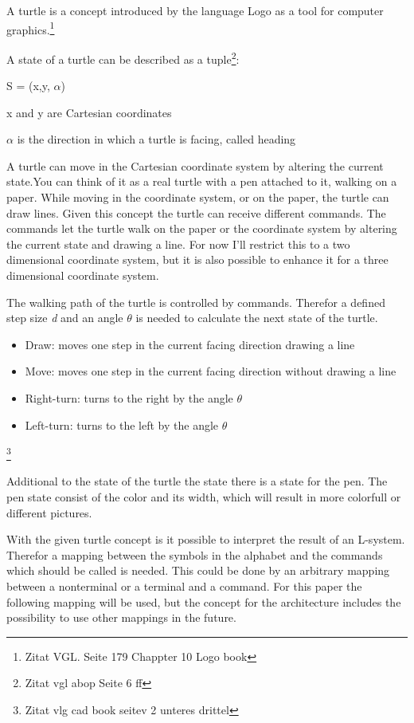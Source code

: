\documentclass[english]{cpp-hmwk}
\begin{document}
\noindent A turtle is a concept introduced by the language Logo as a tool for computer graphics.\footnote{Zitat VGL. Seite 179 Chappter 10 Logo book}

\noindent A state of a turtle can be described as a tuple\footnote{Zitat vgl abop Seite 6 ff}:

\begin{center}
S = (x,y, $\alpha$)
\end{center}

x and y are Cartesian coordinates

$\alpha$ is the direction in which a turtle is facing, called heading

\medskip

\noindent A turtle can move in the Cartesian coordinate system by altering the current state.You can think of it as a real turtle with a pen attached to it, walking on a paper. While moving in the coordinate system, or on the paper, the turtle can draw lines. Given this concept the turtle can receive different commands. The commands let the turtle walk on the paper or the coordinate system by altering the current state and drawing a line. For now I'll restrict this to a two dimensional coordinate system, but it is also possible to enhance it for a three dimensional coordinate system.

\medskip

\noindent The walking path of the turtle is controlled by commands. Therefor a defined step size \textit{d} and an angle \textit{$\theta$ } is needed to calculate the next state of the turtle.

\begin{itemize}
\item Draw: moves one step in the current facing direction drawing a line 
\item Move: moves one step in the current facing direction without drawing a line
\item Right-turn: turns to the right by the angle $\theta$
\item Left-turn: turns to the left by the angle $\theta$
\end{itemize}
\footnote{Zitat vlg cad book seitev 2 unteres drittel}

\noindent Additional to the state of the turtle the state there is a state for the pen. The pen state consist of the color and its width, which will result in more colorfull or different pictures.

\medskip

\noindent  With the given turtle concept is it possible to interpret the result of an L-system. Therefor a mapping between the symbols in the alphabet and the commands which should be called is needed.
This could be done by an arbitrary mapping between a nonterminal or a terminal and a command. For this paper the following mapping will be used, but the concept for the architecture includes the possibility to use other mappings in the future.
\end{document}

